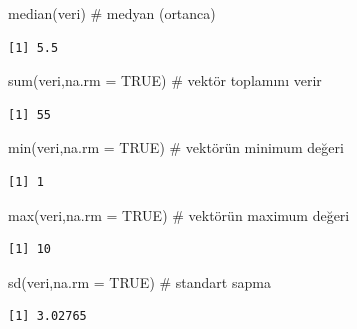 \documentclass[
  letterpaper,
  DIV=11,
  numbers=noendperiod]{scrreprt}
\newenvironment{Shaded}{\begin{snugshade}}{\end{snugshade}}
\newcommand{\AttributeTok}[1]{\textcolor[rgb]{0.40,0.45,0.13}{#1}}
\newcommand{\CommentTok}[1]{\textcolor[rgb]{0.37,0.37,0.37}{#1}}
\newcommand{\ConstantTok}[1]{\textcolor[rgb]{0.56,0.35,0.01}{#1}}
\newcommand{\FunctionTok}[1]{\textcolor[rgb]{0.28,0.35,0.67}{#1}}
\newcommand{\NormalTok}[1]{\textcolor[rgb]{0.00,0.23,0.31}{#1}}
\begin{document}
\begin{Shaded}
\begin{Highlighting}[]
\FunctionTok{median}\NormalTok{(veri) }\CommentTok{\# medyan (ortanca)}
\end{Highlighting}
\end{Shaded}

\begin{verbatim}
[1] 5.5
\end{verbatim}

\begin{Shaded}
\begin{Highlighting}[]
\FunctionTok{sum}\NormalTok{(veri,}\AttributeTok{na.rm =} \ConstantTok{TRUE}\NormalTok{) }\CommentTok{\# vektör toplamını verir}
\end{Highlighting}
\end{Shaded}

\begin{verbatim}
[1] 55
\end{verbatim}

\begin{Shaded}
\begin{Highlighting}[]
\FunctionTok{min}\NormalTok{(veri,}\AttributeTok{na.rm =} \ConstantTok{TRUE}\NormalTok{) }\CommentTok{\# vektörün minimum değeri}
\end{Highlighting}
\end{Shaded}

\begin{verbatim}
[1] 1
\end{verbatim}

\begin{Shaded}
\begin{Highlighting}[]
\FunctionTok{max}\NormalTok{(veri,}\AttributeTok{na.rm =} \ConstantTok{TRUE}\NormalTok{) }\CommentTok{\# vektörün maximum değeri}
\end{Highlighting}
\end{Shaded}

\begin{verbatim}
[1] 10
\end{verbatim}

\begin{Shaded}
\begin{Highlighting}[]
\FunctionTok{sd}\NormalTok{(veri,}\AttributeTok{na.rm =} \ConstantTok{TRUE}\NormalTok{) }\CommentTok{\# standart sapma}
\end{Highlighting}
\end{Shaded}

\begin{verbatim}
[1] 3.02765
\end{verbatim}
\end{document}

